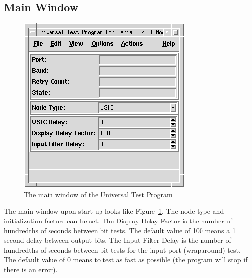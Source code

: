 \subsection{Main Window}
\begin{figure}[hbpt]
\begin{centering}
\includegraphics{UTMain.png}
\caption{The main window of the Universal Test Program}
\label{fig:ut:main}
\end{centering}
\end{figure}
The main window upon start up looks like Figure~\ref{fig:ut:main}. The
node type and initialization factors can be set.  The Display Delay
Factor is the number of hundredths of seconds between bit tests.  The
default value of 100 means a 1 second delay between output bits.  The
Input Filter Delay is the number of hundredths of seconds between bit
tests for the input port (wraparound) test.  The default value of 0
means to test as fast as possible (the program will stop if there is an
error).

